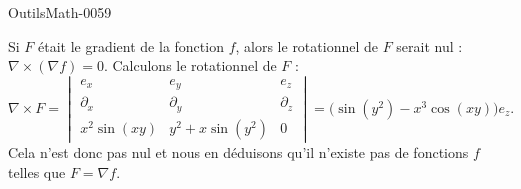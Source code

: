 
\begin{corrige}{OutilsMath-0059}

    Si $F$ était le gradient de la fonction $f$, alors le rotationnel de $F$ serait nul : $\nabla\times(\nabla f)=0$. Calculons le rotationnel de $F$ :
    \begin{equation}
        \nabla\times F=\begin{vmatrix}
           e_x &   e_y    &   e_z    \\
            \partial_x    &   \partial_y    &   \partial_z    \\
            x^2\sin(xy)    &   y^2+x\sin(y^2)    &   0
        \end{vmatrix}=
        \big( \sin(y^2)-x^3\cos(xy) \big)e_z.
    \end{equation}
    Cela n'est donc pas nul et nous en déduisons qu'il n'existe pas de fonctions $f$ telles que $F=\nabla f$.

\end{corrige}
